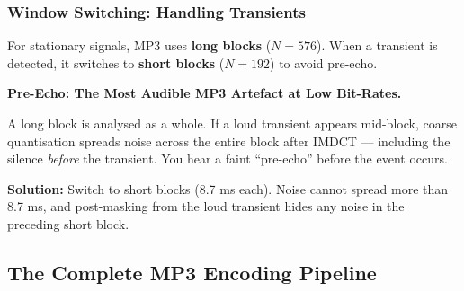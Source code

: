 \subsubsection{Window Switching: Handling Transients}

For stationary signals, MP3 uses \textbf{long blocks} ($N=576$). When a transient is detected, it switches to \textbf{short blocks} ($N=192$) to avoid pre-echo.

\begin{warningbox}
\textbf{Pre-Echo: The Most Audible MP3 Artefact at Low Bit-Rates.}

A long block is analysed as a whole. If a loud transient appears mid-block, coarse quantisation spreads noise across the entire block after IMDCT --- including the silence \emph{before} the transient. You hear a faint ``pre-echo'' before the event occurs.

\textbf{Solution:} Switch to short blocks (8.7 ms each). Noise cannot spread more than 8.7 ms, and post-masking from the loud transient hides any noise in the preceding short block.
\end{warningbox}

\subsection{The Complete MP3 Encoding Pipeline}

